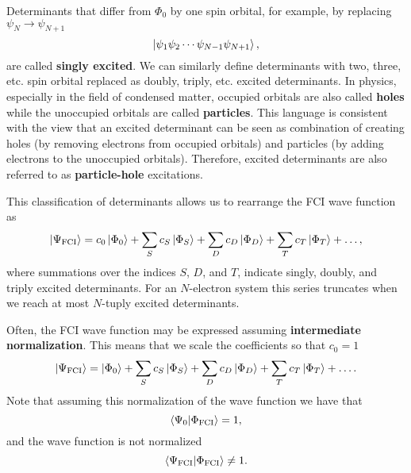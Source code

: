 \documentclass[../Main/chem532-notes.tex]{subfiles}
\begin{document}
Determinants that differ from $\Phi_0$ by one spin orbital, for example, by replacing $\psi_N \rightarrow \psi_{N+1}$ 
\begin{equation}
\ket{\psi_1 \psi_2 \cdots \psi_{N -1 }\psi_{N + 1}},
\end{equation}
are called \textbf{singly excited}.
We can similarly define determinants with two, three, etc. spin orbital replaced as doubly, triply, etc. excited determinants.
In physics, especially in the field of condensed matter, occupied orbitals are also called \textbf{holes} while the unoccupied orbitals are called \textbf{particles}.
This language is consistent with the view that an excited determinant can be seen as combination of creating holes (by removing electrons from occupied orbitals) and particles (by adding electrons to the unoccupied orbitals).
Therefore, excited determinants are also referred to as \textbf{particle-hole} excitations.

This classification of determinants allows us to rearrange the FCI wave function as
\begin{equation}
\ket{\Psi_\mathrm{FCI}} = c_0 \ket{\Phi_0} + \sum_S c_S \ket{\Phi_S} + \sum_D c_D \ket{\Phi_D} + \sum_T c_T \ket{\Phi_T} + \ldots,
\end{equation}
where summations over the indices $S$, $D$, and $T$, indicate singly, doubly, and triply excited determinants.
For an $N$-electron system this series truncates when we reach at most $N$-tuply excited determinants.

Often, the FCI wave function may be expressed assuming \textbf{intermediate normalization}.
This means that we scale the coefficients so that $c_0 = 1$
\begin{equation}
\label{eq:fci_intermediate_normalization}
\ket{\Psi_\mathrm{FCI}} = \ket{\Phi_0} + \sum_S c_S \ket{\Phi_S} + \sum_D c_D \ket{\Phi_D} + \sum_T c_T \ket{\Phi_T} + \ldots.
\end{equation}
Note that assuming this normalization of the wave function we have that
\begin{equation}
\braket{\Psi_0| \Phi_\mathrm{FCI} } = 1,
\end{equation}
and the wave function is not normalized
\begin{equation}
\braket{\Psi_\mathrm{FCI} | \Phi_\mathrm{FCI} } \neq 1.
\end{equation}
\end{document}
